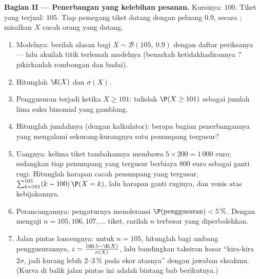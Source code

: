 \begin{problem}
\medskip
\noindent\textbf{Bagian II --- Penerbangan yang kelebihan pesanan.}
Kursinya: $100$. Tiket yang terjual: $105$. Tiap pemegang tiket datang
dengan peluang $0.9$, secara ; misalkan $X$ cacah orang yang
datang.
\begin{enumerate}[resume]
  \item Modelnya: berilah alasan bagi $X \sim \mathcal B(105,\ 0.9)$ dengan
        daftar periksanya --- lalu akuilah titik terlemah modelnya
        (benarkah ketidakhadirannya ? pikirkanlah rombongan dan
        badai).
  \item Hitunglah $\E(X)$ dan $\sigma(X)$.
  \item Penggusuran terjadi ketika $X \geq 101$: tulislah
        $\P(X \geq 101)$ sebagai jumlah lima suku binomial yang
        gamblang.
  \item Hitunglah jumlahnya (dengan kalkulator): berapa bagian penerbangannya
        yang mengalami sekurang-kurangnya satu penumpang tergusur?
  \item Uangnya: kelima tiket tambahannya membawa
        $5 \times 200 = 1\,000$ euro; sedangkan tiap penumpang yang tergusur
        berbiaya $800$ euro sebagai ganti rugi. Hitunglah harapan
        cacah penumpang yang tergusur,
        $\sum_{k=101}^{105} (k - 100)\,\P(X = k)$, lalu harapan
        ganti ruginya, dan vonis atas kebijakannya.
  \item Perancangannya: pengaturnya menoleransi
        $\P(\text{penggusuran}) < 5\,\%$. Dengan menguji
        $n = 105, 106, 107, \dots$ tiket, carilah $n$ terbesar
        yang diperbolehkan.
  \item Jalan pintas loncengnya: untuk $n = 105$, hitunglah 
        bagi ambang penggusurannya,
        $z = \frac{100.5 - \E(X)}{\sigma(X)}$, lalu bandingkan
        taksiran kasar ``kira-kira $2\sigma$, jadi kurang lebih $2$--$3\,\%$ pada
        ekor atasnya'' dengan jawaban eksakmu. (Kurva
        di balik jalan pintas ini adalah bintang bab
        berikutnya.)
\end{enumerate}


\end{problem}
